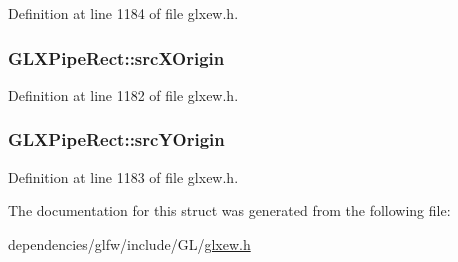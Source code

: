 Definition at line 1184 of file glxew.\-h.

\hypertarget{struct_g_l_x_pipe_rect_a9df2313c01f75d149e64f2ff467bc266}{
\subsubsection[{src\-X\-Origin}]{ G\-L\-X\-Pipe\-Rect\-::src\-X\-Origin}}\label{struct_g_l_x_pipe_rect_a9df2313c01f75d149e64f2ff467bc266}


Definition at line 1182 of file glxew.\-h.

\hypertarget{struct_g_l_x_pipe_rect_a1f7316dff7050ab2ce9d3d37f8c5450e}{
\subsubsection[{src\-Y\-Origin}]{ G\-L\-X\-Pipe\-Rect\-::src\-Y\-Origin}}\label{struct_g_l_x_pipe_rect_a1f7316dff7050ab2ce9d3d37f8c5450e}


Definition at line 1183 of file glxew.\-h.



The documentation for this struct was generated from the following file\-:\begin{DoxyCompactItemize}
\item 
dependencies/glfw/include/\-G\-L/\hyperlink{glxew_8h}{glxew.\-h}\end{DoxyCompactItemize}
